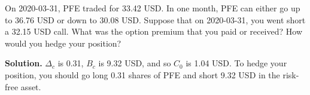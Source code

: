 \noindent On 2020-03-31, PFE traded for 33.42 USD. In one month, PFE can either go up to 36.76 USD or down to 30.08 USD. Suppose that on 2020-03-31, you went short a 32.15 USD call. What was the option premium that you paid or received? How would you hedge your position?

\vspace{9pt}

\noindent\textbf{Solution.} $\Delta_{c}$ is 0.31, $B_{c}$ is 9.32 USD, and so $C_{0}$ is 1.04 USD. To hedge your position, you should go long 0.31 shares of PFE and short 9.32 USD in the risk-free asset.